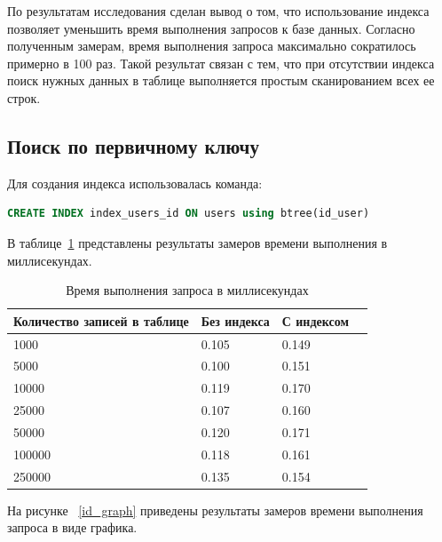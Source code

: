 По результатам исследования сделан вывод о том, что использование индекса позволяет уменьшить время выполнения запросов к базе данных.
Согласно полученным замерам, время выполнения запроса максимально сократилось примерно в 100 раз.
  Такой результат связан с тем, что при отсутствии индекса поиск нужных данных в таблице выполняется простым сканированием всех ее строк.

\subsection{Поиск по первичному ключу}
Для создания индекса использовалась команда:
\begin{lstlisting}[language=SQL]
	CREATE INDEX index_users_id ON users using btree(id_user)
\end{lstlisting}

В таблице~\ref{id_table} представлены результаты замеров времени выполнения в миллисекундах.


\begin{table}[ht]
	\begin{center}
		\begin{threeparttable}
			\caption{\label{id_table} Время выполнения запроса в миллисекундах}
			\begin{tabular}{|p{7cm}|p{4cm}|p{4cm}|c|}
				\hline
				\textbf{Количество записей в таблице} & \textbf{Без индекса} & {С индексом} \\ \hline
				1000 & 0.105 & 0.149 \\ \hline
				5000 & 0.100 & 0.151 \\ \hline
				10000 & 0.119 & 0.170 \\ \hline
				25000 & 0.107 & 0.160 \\ \hline
				50000 & 0.120 & 0.171 \\ \hline
				100000 & 0.118 & 0.161 \\ \hline
				250000 & 0.135 & 0.154 \\ \hline
				
			\end{tabular}
		\end{threeparttable}
	\end{center}
\end{table}


На рисунке ~\ref{id_graph} приведены результаты замеров времени выполнения запроса в виде графика.

